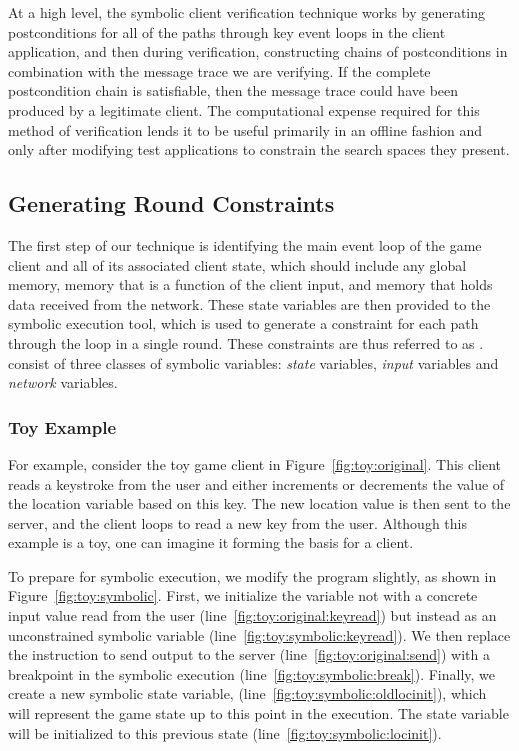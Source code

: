 At a high level, the symbolic client verification
technique works by generating postconditions for
all of the paths through key event loops in the client application,
and then during verification, constructing chains of postconditions in
combination with the message trace we are verifying. If the complete
postcondition chain is satisfiable, then the message trace could have
been produced by a legitimate client. The computational expense
required for this method of verification lends it to be useful
primarily in an offline fashion and only after modifying test
applications to constrain the search spaces they present.

\subsection{Generating Round Constraints}
\label{ssec:scv:approach:constraint}

The first step of our technique is identifying the main event loop of
the game client and all of its associated client state, which should
include any global memory, memory that is a function of the client
input, and memory that holds data received from the network.  These
state variables are then provided to the symbolic execution tool,
which is used to generate a constraint for each path through the loop
in a single round. These constraints are thus referred to as {\em \pathsegcons}.
\Pathsegcons consist of three classes of symbolic variables: {\em
state} variables, {\em input} variables and {\em network} variables.

\subsubsection{Toy Example}

For example, consider the toy game client in
Figure~\ref{fig:toy:original}.  This client reads a keystroke from the
user and either increments or decrements the value of the location
variable \toyloc based on this key.  The new location
value is then sent to the server, and the client loops to read a new
key from the user.  Although this example is a toy, one can imagine it
forming the basis for a \pong client.

To prepare for symbolic execution, we modify the program slightly, as
shown in Figure~\ref{fig:toy:symbolic}.  First, we initialize the
variable \toykey not with a concrete input value read from the user
(line~\ref{fig:toy:original:keyread}) but instead as an unconstrained
symbolic variable (line~\ref{fig:toy:symbolic:keyread}).  We then
replace the instruction to send output to the server
(line~\ref{fig:toy:original:send}) with a breakpoint in the symbolic
execution (line~\ref{fig:toy:symbolic:break}).  Finally, we create a
new symbolic state variable, \toyoldloc
(line~\ref{fig:toy:symbolic:oldlocinit}), which will represent the
game state up to this point in the execution.  The state variable
\toyloc will be initialized to this previous state
(line~\ref{fig:toy:symbolic:locinit}).  


